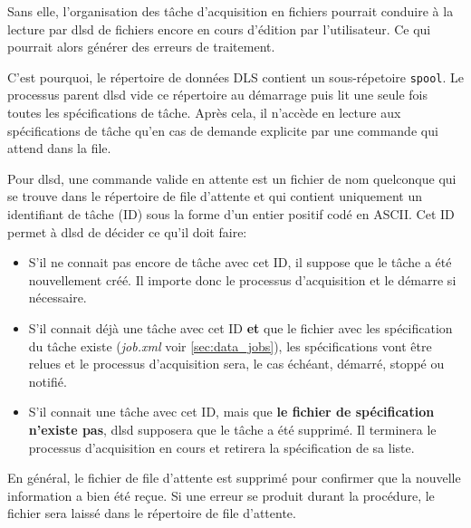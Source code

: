 \documentclass[a4paper,12pt,BCOR6mm,bibtotoc,idxtotoc]{scrbook}
\begin{document}
Sans elle, l'organisation des t\^ache d'acquisition
en fichiers pourrait conduire \`a la lecture par dlsd de fichiers
encore en cours d'\'edition par l'utilisateur. Ce qui pourrait alors
g\'en\'erer des erreurs de traitement.

C'est pourquoi, le r\'epertoire de donn\'ees DLS contient un
sous-r\'epetoire \texttt{spool}.  Le processus parent dlsd vide ce
r\'epertoire au d\'emarrage puis lit une seule fois toutes les
sp\'ecifications de t\^ache.  Apr\`es cela, il n'acc\`ede en lecture
aux sp\'ecifications de t\^ache qu'en cas de demande explicite par une
commande qui attend dans la file.


Pour dlsd, une commande valide en attente est un fichier de nom
quelconque qui se trouve dans le r\'epertoire de file d'attente et qui
contient uniquement un identifiant de t\^ache (ID) sous la forme d'un
entier positif cod\'e en ASCII.  Cet ID permet \`a dlsd de d\'ecider
ce qu'il doit faire:


\begin{itemize}

\item S'il ne connait pas encore de t\^ache avec cet ID, il suppose
  que le t\^ache a \'et\'e nouvellement cr\'e\'e. Il importe donc le
  processus d'acquisition et le d\'emarre si n\'ecessaire.

\item S'il connait d\'ej\`a une t\^ache avec cet ID
  \textbf{et} que le fichier avec les sp\'ecification du t\^ache
  existe (\textit{job.xml} voir \autoref{sec:data_jobs}), les
  sp\'ecifications vont \^etre relues et le processus d'acquisition
  sera, le cas \'ech\'eant, d\'emarr\'e, stopp\'e ou notifi\'e.

\item S'il connait une t\^ache avec cet ID, mais que \textbf{le fichier
  de sp\'ecification n'existe pas}, dlsd supposera que le t\^ache a
  \'et\'e supprim\'e. Il terminera le processus d'acquisition en cours
  et retirera la sp\'ecification de sa liste.

\end{itemize}

En g\'en\'eral, le fichier de file d'attente est supprim\'e pour
confirmer que la nouvelle information a bien \'et\'e re\c cue. Si une
erreur se produit durant la proc\'edure, le fichier sera laiss\'e dans
le r\'epertoire de file d'attente.


\end{document}
